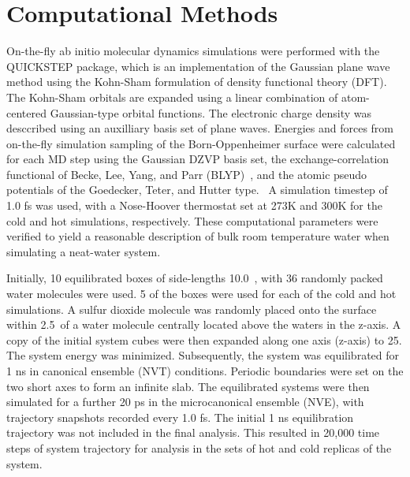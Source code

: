 \section{Computational Methods}

On-the-fly ab initio molecular dynamics simulations were performed with the QUICKSTEP package, which is an implementation of the Gaussian plane wave method using the Kohn-Sham formulation of density functional theory (DFT).~\cite{VandeVondele2005} The Kohn-Sham orbitals are expanded using a linear combination of atom-centered Gaussian-type orbital functions. The electronic charge density was desccribed using an auxilliary basis set of plane waves. Energies and forces from on-the-fly simulation sampling of the Born-Oppenheimer surface were calculated for each MD step using the Gaussian DZVP basis set, the exchange-correlation functional of Becke, Lee, Yang, and Parr (BLYP)~\cite{LEE1988}, and the atomic pseudo potentials of the Goedecker, Teter, and Hutter type.~\cite{Goedecker1996} A simulation timestep of 1.0 fs was used, with a Nose-Hoover thermostat set at 273K and 300K for the cold and hot simulations, respectively. These computational parameters were verified to yield a reasonable description of bulk room temperature water when simulating a neat-water system. 

Initially, 10 equilibrated boxes of side-lengths 10.0\angs~, with 36 randomly packed water molecules were used. 5 of the boxes were used for each of the cold and hot simulations. A sulfur dioxide molecule was randomly placed onto the surface within 2.5\angs~of a water molecule centrally located above the waters in the z-axis. A copy of the initial system cubes were then expanded along one axis (z-axis) to 25\angs. The system energy was minimized. Subsequently, the system was equilibrated for 1 ns in canonical ensemble (NVT) conditions. Periodic boundaries were set on the two short axes to form an infinite slab. The equilibrated systems were then simulated for a further 20 ps in the microcanonical ensemble (NVE), with trajectory snapshots recorded every 1.0 fs. The initial 1 ns equilibration trajectory was not included in the final analysis. This resulted in 20,000 time steps of system trajectory for analysis in the sets of hot and cold replicas of the system.
 
